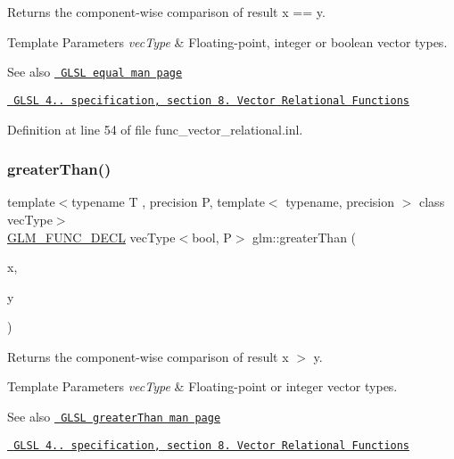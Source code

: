 Returns the component-\/wise comparison of result x == y.


\begin{DoxyTemplParams}{Template Parameters}
{\em vec\+Type} & Floating-\/point, integer or boolean vector types.\\
\hline
\end{DoxyTemplParams}
\begin{DoxySeeAlso}{See also}
\href{http://www.opengl.org/sdk/docs/manglsl/xhtml/equal.xml}{\texttt{ G\+L\+SL equal man page}} 

\href{http://www.opengl.org/registry/doc/GLSLangSpec.4.20.8.pdf}{\texttt{ G\+L\+SL 4.. specification, section 8. Vector Relational Functions}} 
\end{DoxySeeAlso}


Definition at line 54 of file func\+\_\+vector\+\_\+relational.\+inl.

\mbox{\label{group__core__func__vector__relational_gadd80263161a308462d3e3e287e79cccd}} 
\subsubsection{\texorpdfstring{greaterThan()}{greaterThan()}}
{\footnotesize\ttfamily template$<$typename T , precision P, template$<$ typename, precision $>$ class vec\+Type$>$ \\
\mbox{\hyperlink{setup_8hpp_ab2d052de21a70539923e9bcbf6e83a51}{G\+L\+M\+\_\+\+F\+U\+N\+C\+\_\+\+D\+E\+CL}} vec\+Type$<$bool, P$>$ glm\+::greater\+Than (\begin{DoxyParamCaption}\item[{vec\+Type$<$ T, P $>$ const \&}]{x,  }\item[{vec\+Type$<$ T, P $>$ const \&}]{y }\end{DoxyParamCaption})}

Returns the component-\/wise comparison of result x $>$ y.


\begin{DoxyTemplParams}{Template Parameters}
{\em vec\+Type} & Floating-\/point or integer vector types.\\
\hline
\end{DoxyTemplParams}
\begin{DoxySeeAlso}{See also}
\href{http://www.opengl.org/sdk/docs/manglsl/xhtml/greaterThan.xml}{\texttt{ G\+L\+SL greater\+Than man page}} 

\href{http://www.opengl.org/registry/doc/GLSLangSpec.4.20.8.pdf}{\texttt{ G\+L\+SL 4.. specification, section 8. Vector Relational Functions}} 
\end{DoxySeeAlso}


